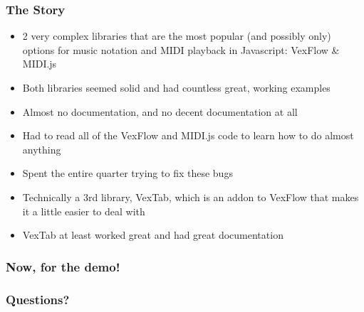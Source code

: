 \documentclass[24pt]{beamer}
\begin{document}
\begin{frame}
\frametitle{The Story}
\begin{itemize}
  \item 2 very complex libraries that are the most popular (and possibly only) options for music notation and MIDI playback in Javascript: VexFlow \& MIDI.js
  \item Both libraries seemed solid and had countless great, working examples
  \item Almost no documentation, and no decent documentation at all
  \item Had to read all of the VexFlow and MIDI.js code to learn how to do almost anything
  \item Spent the entire quarter trying to fix these bugs
  \item Technically a 3rd library, VexTab, which is an addon to VexFlow that makes it a little easier to deal with
  \item VexTab at least worked great and had great documentation
\end{itemize}
\end{frame}

\begin{frame}
\frametitle{Now, for the demo!}
\end{frame}

\begin{frame}
\frametitle{Questions?}
\end{frame}
\end{document}
